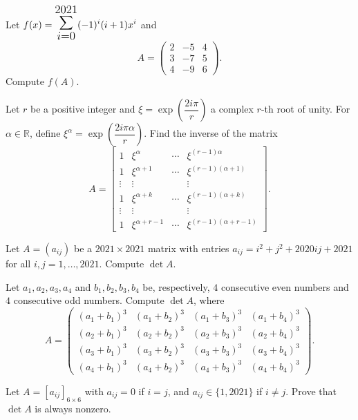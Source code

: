 \documentclass[12pt]{article}
\let\oldsum\sum
\renewcommand{\sum}{\mathlarger{\mathlarger{\oldsum}}}
\begin{document}
\begin{problem}
Let $f(x)=\displaystyle\sum_{i=0}^{2021}(-1)^i(i+1)x^i$ and
\[ A=\begin{pmatrix}2&-5&4\\3&-7&5\\4&-9&6\end{pmatrix}. \]
Compute $f(A)$.
\end{problem}

\begin{problem}
Let $r$ be a positive integer and $\xi=\exp\!\left(\dfrac{2i\pi}{r}\right)$ a complex $r$-th root of unity. For $\alpha \in \mathbb{R}$, define $\xi^\alpha = \exp\!\left(\dfrac{2i\pi\alpha}{r}\right)$. Find the inverse of the matrix
\[
A = \begin{bmatrix}
1 & \xi^\alpha & \cdots & \xi^{(r-1)\alpha}\\
1 & \xi^{\alpha+1} & \cdots & \xi^{(r-1)(\alpha+1)}\\
\vdots & \vdots & & \vdots\\
1 & \xi^{\alpha+k} & \cdots & \xi^{(r-1)(\alpha+k)}\\
\vdots & \vdots & & \vdots\\
1 & \xi^{\alpha+r-1} & \cdots & \xi^{(r-1)(\alpha+r-1)}
\end{bmatrix}.
\]
\end{problem}

\begin{problem}
Let $A=(a_{ij})$ be a $2021\times 2021$ matrix with entries $a_{ij}=i^2+j^2+2020ij+2021$ for all $i,j=1,\dots,2021$. Compute $\det A$.
\end{problem}

\begin{problem}
Let $a_1,a_2,a_3,a_4$ and $b_1,b_2,b_3,b_4$ be, respectively, $4$ consecutive even numbers and $4$ consecutive odd numbers. Compute $\det A$, where
\[
A = \begin{pmatrix}
(a_1+b_1)^3 & (a_1+b_2)^3 & (a_1+b_3)^3 & (a_1+b_4)^3\\
(a_2+b_1)^3 & (a_2+b_2)^3 & (a_2+b_3)^3 & (a_2+b_4)^3\\
(a_3+b_1)^3 & (a_3+b_2)^3 & (a_3+b_3)^3 & (a_3+b_4)^3\\
(a_4+b_1)^3 & (a_4+b_2)^3 & (a_4+b_3)^3 & (a_4+b_4)^3
\end{pmatrix}.
\]
\end{problem}

\begin{problem}
Let $A=[a_{ij}]_{6\times 6}$ with $a_{ij}=0$ if $i=j$, and $a_{ij}\in\{1,2021\}$ if $i\neq j$. Prove that $\det A$ is always nonzero.
\end{problem}
\end{document}
